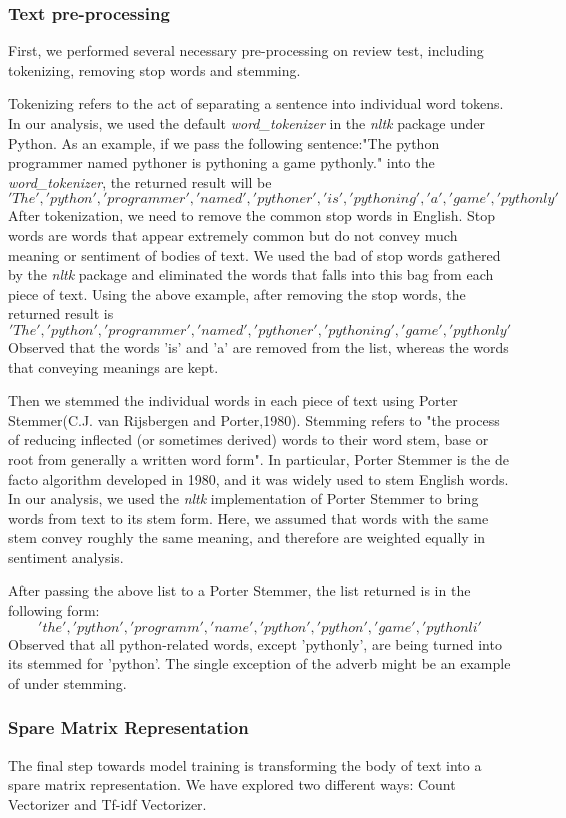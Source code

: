 \documentclass{article}
\begin{document}
\subsubsection{Text pre-processing}
First, we performed several necessary pre-processing on review test, including tokenizing, removing stop words and stemming.

Tokenizing refers to the act of separating a sentence into individual word tokens. In our analysis, we used the default \textit{word\_tokenizer} in the \textit{nltk} package under Python. As an example, if we pass the following sentence:"The python programmer named pythoner is pythoning a game pythonly." into the \textit{word\_tokenizer}, the returned result will be 
\['The','python','programmer', 'named', 'pythoner', 'is', 'pythoning', 'a', 'game', 'pythonly'\] 
After tokenization, we need to remove the common stop words in English. Stop words are words that appear extremely common but do not convey much meaning or sentiment of bodies of text. We used the bad of stop words gathered by the \textit{nltk} package and eliminated the words that falls into this bag from each piece of text. Using the above example, after removing the stop words, the returned result is 
\['The','python','programmer', 'named', 'pythoner', 'pythoning', 'game', 'pythonly'\] 
Observed that the words 'is' and 'a' are removed from the list, whereas the words that conveying meanings are kept. 

Then we stemmed the individual words in each piece of text using Porter Stemmer(C.J. van Rijsbergen and Porter,1980). Stemming refers to "the process of reducing inflected (or sometimes derived) words to their word stem, base or root from generally a written word form". In particular, Porter Stemmer is the de facto algorithm developed in 1980, and it was widely used to stem English words. In our analysis, we used the \textit{nltk} implementation of Porter Stemmer to bring words from text to its stem form. Here, we assumed that words with the same stem convey roughly the same meaning, and therefore are weighted equally in sentiment analysis. 

After passing the above list to a Porter Stemmer, the list returned is in the following form: 
\['the','python','programm', 'name', 'python', 'python', 'game', 'pythonli'\]
Observed that all python-related words, except 'pythonly', are being turned into its stemmed for 'python'. The single exception of the adverb might be an example of under stemming. 

\subsubsection{Spare Matrix Representation}
The final step towards model training is transforming the body of text into a spare matrix representation. We have explored two different ways: Count Vectorizer and Tf-idf Vectorizer. 
\end{document}
